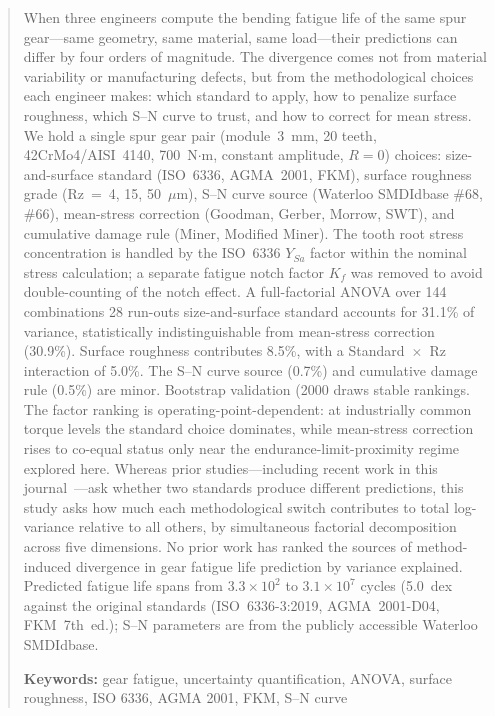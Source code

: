 \documentclass[12pt,a4paper]{article}
\begin{document}
\begin{abstract}
\label{sec:abstract}

When three engineers compute the bending fatigue life of the same spur
gear---same geometry, same material, same load---their predictions can
differ by four orders of magnitude. The divergence comes not from
material variability or manufacturing defects, but from the
methodological choices each engineer makes: which standard to apply, how
to penalize surface roughness, which S--N curve to trust, and how to
correct for mean stress. We hold a single spur gear pair
(module~3~mm,%
20 teeth,%
42CrMo4/AISI~4140,%
700~N$\cdot$m,%
constant amplitude, $R=0$)%
choices: size-and-surface standard (ISO~6336, AGMA~2001, FKM), surface
roughness grade (Rz~=~4, 15, 50~$\mu$m), S--N curve source (Waterloo
SMDIdbase \#68, \#66), mean-stress correction (Goodman, Gerber, Morrow,
SWT), and cumulative damage rule (Miner, Modified Miner). The tooth
root stress concentration is handled by the ISO~6336 $Y_{Sa}$ factor
within the nominal stress calculation; a separate fatigue notch factor
$K_f$ was removed to avoid double-counting of the notch effect. A
full-factorial ANOVA over 144 combinations%
28 run-outs%
size-and-surface standard accounts for 31.1\% of variance, statistically
indistinguishable from mean-stress correction (30.9\%). Surface
roughness contributes 8.5\%, with a Standard~$\times$~Rz interaction of
5.0\%. The S--N curve source (0.7\%) and cumulative damage rule (0.5\%)
are minor. Bootstrap validation (2000 draws%
stable rankings. The factor ranking is operating-point-dependent: at
industrially common torque levels the standard choice dominates, while
mean-stress correction rises to co-equal status only near the
endurance-limit-proximity regime explored here. Whereas prior studies---including recent work in this
journal~\cite{bonaiti2024}---ask whether two standards produce different
predictions, this study asks how much each methodological switch contributes
to total log-variance relative to all others, by simultaneous factorial
decomposition across five dimensions. No prior work has ranked the
sources of method-induced divergence in gear fatigue life prediction by
variance explained. Predicted fatigue life spans from $3.3\times10^2$ to
$3.1\times10^7$ cycles (5.0~dex%
against the original standards (ISO~6336-3:2019, AGMA~2001-D04,
FKM~7th~ed.); S--N parameters are from the publicly accessible Waterloo
SMDIdbase.

\textbf{Keywords:} gear fatigue, uncertainty quantification, ANOVA,
surface roughness, ISO 6336, AGMA 2001, FKM, S--N curve
\end{abstract}
\end{document}
